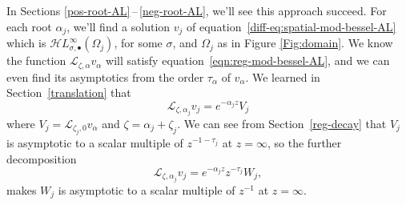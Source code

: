 \documentclass{article}
\newcommand{\singexp}[2]{\mathcal{H}L^\infty_{#1, #2}}
\newcommand{\singexpalg}[1]{\singexp{#1}{\bullet}}
\theoremstyle{definition}
\newcommand{\fracderiv}[3]{\partial^{#1}_{#2, #3}}
\newcommand{\laplace}{\mathcal{L}}
\begin{document}
In Sections \ref{pos-root-AL}\,--\,\ref{neg-root-AL}, we'll see this approach succeed. For each root $\alpha_j$, we'll find a solution $v_j$ of equation~\eqref{diff-eq:spatial-mod-bessel-AL} which is $\singexpalg{\sigma}(\Omega_j)$, for some $\sigma$, and $\Omega_j$ as in Figure \ref{Fig:domain}. We know the function $\laplace_{\zeta, \alpha} v_\alpha$ will satisfy equation~\eqref{eqn:reg-mod-bessel-AL}, and we can even find its asymptotics from the order $\tau_\alpha$ of $v_\alpha$. We learned in Section~\ref{translation} that
\[ \laplace_{\zeta, \alpha_j} v_j = e^{-\alpha_j z} V_j \]
where $V_j = \laplace_{\zeta_j, 0} v_\alpha$ and $\zeta = \alpha_j + \zeta_j$. We can see from Section~\ref{reg-decay} that $V_j$ is asymptotic to a scalar multiple of $z^{-1 - \tau_j}$ at $z = \infty$, so the further decomposition
\[ \laplace_{\zeta, \alpha_j} v_j = e^{-\alpha_j z} z^{-\tau_j} W_j, \]
makes $W_j$ is asymptotic to a scalar multiple of $z^{-1}$ at $z = \infty$.
\end{document}
